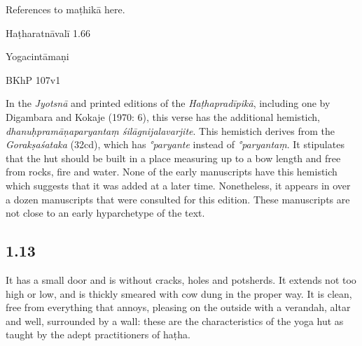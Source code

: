 \begin{ekdosis}
\begin{sources}[hp01_012]
References to maṭhikā here.
\end{sources}

\begin{testimonia}[hp01_012]
Haṭharatnāvalī 1.66

\begin{versinnote}
\end{versinnote}

Yogacintāmaṇi

\begin{versinnote}
\end{versinnote}

BKhP 107v1
\end{testimonia}

\begin{philcomm}[hp01_012]        
In the \emph{Jyotsnā} and printed editions of the \emph{Haṭhapradīpikā}, including one by Digambara and Kokaje (1970: 6), this verse has the additional hemistich, \emph{dhanuḥpramāṇaparyantaṃ śilāgnijalavarjite}. This hemistich derives from the \emph{Gorakṣaśataka} (32cd), which has \emph{°paryante} instead of \emph{°paryantaṃ}. It stipulates that the hut should be built in a place measuring up to a bow length and free from rocks, fire and water. None of the early manuscripts have this hemistich which suggests that it was added at a later time. Nonetheless, it appears in over a dozen manuscripts that were consulted for this edition. These manuscripts are not close to an early hyparchetype of the text.
\end{philcomm}

\subsection*{1.13}
\begin{translation}[hp01_013]
It has a small door and is without cracks, holes and potsherds. It extends not too high or low, and is thickly smeared with cow dung in the proper way. It is clean, free from everything that annoys, pleasing on the outside with a verandah, altar and well, surrounded by a wall: these are the characteristics of the yoga hut as taught by the adept practitioners of haṭha.
\end{translation}


\end{ekdosis}

